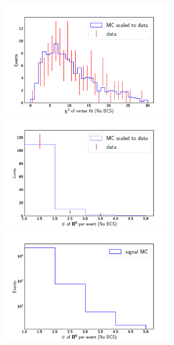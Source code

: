 \begin{figure}[htpb]
	\begin{minipage}[b]{0.5\linewidth}
		\centering 
		\includegraphics[width=1\linewidth, height=6cm]{figures/best_treeFitChi2_noBCS}
		
	\end{minipage}
	\begin{minipage}[b]{0.5\linewidth}
		\centering 
		\includegraphics[width=1\linewidth, height=6cm]{figures/best_ncands_noBCS}
		
	\end{minipage}
	\begin{minipage}[b]{0.5\linewidth}
		\centering 
		\includegraphics[width=1\linewidth, height=6cm]{figures/best_ncands_sig}
		

\end{minipage}
\end{figure}
